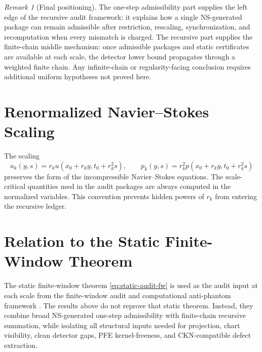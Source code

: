 \documentclass[11pt]{article}
\numberwithin{equation}{section}
\theoremstyle{plain}
\theoremstyle{definition}
\theoremstyle{remark}
\newtheorem{remark}[theorem]{Remark}
\begin{document}
\begin{remark}[Final positioning]
The one-step admissibility part supplies the left edge of the recursive audit framework: it explains how a single NS-generated package can remain admissible after restriction, rescaling, synchronization, and recomputation when every mismatch is charged.  The recursive part supplies the finite-chain middle mechanism: once admissible packages and static certificates are available at each scale, the detector lower bound propagates through a weighted finite chain.  Any infinite-chain or regularity-facing conclusion requires additional uniform hypotheses not proved here.
\end{remark}


\appendix

\section{Renormalized Navier--Stokes Scaling}

The scaling
\[
  u_k(y,s)=r_k u(x_0+r_ky,t_0+r_k^2s),\qquad
  p_k(y,s)=r_k^2 p(x_0+r_ky,t_0+r_k^2s)
\]
preserves the form of the incompressible Navier--Stokes equations.  The scale-critical quantities used in the audit packages are always computed in the normalized variables.  This convention prevents hidden powers of \(r_k\) from entering the recursive ledger.

\section{Relation to the Static Finite-Window Theorem}

The static finite-window theorem \eqref{eq:static-audit-fw} is used as the audit input at each scale from the finite-window audit and computational anti-phantom framework \cite{YuSingularityAuditTransfer2026,YuComputationalAntiPhantom2026}.  The results above do not reprove that static theorem.  Instead, they combine broad NS-generated one-step admissibility with finite-chain recursive summation, while isolating all structural inputs needed for projection, chart visibility, clean detector gaps, PFE kernel-freeness, and CKN-compatible defect extraction.
\end{document}
